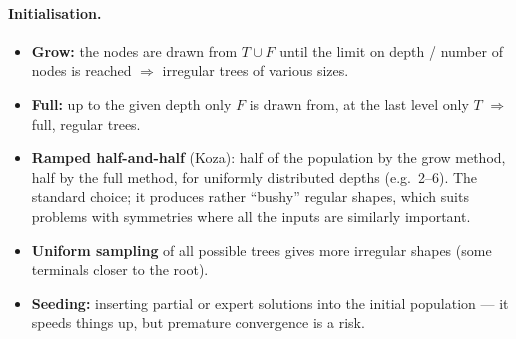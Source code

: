 \documentclass[11pt,a4paper]{article}
\theoremstyle{definition}
\providecommand{\uv}[1]{``#1''}
\begin{document}
\paragraph{Initialisation.}
\begin{itemize}
\item \textbf{Grow:} the nodes are drawn from $T \cup F$ until the limit on
  depth / number of nodes is reached $\Rightarrow$ irregular trees of various
  sizes.
\item \textbf{Full:} up to the given depth only $F$ is drawn from, at the last
  level only $T$ $\Rightarrow$ full, regular trees.
\item \textbf{Ramped half-and-half} (Koza): half of the population by the grow
  method, half by the full method, for uniformly distributed depths (e.g.\
  2--6). The standard choice; it produces rather \uv{bushy} regular shapes,
  which suits problems with symmetries where all the inputs are similarly
  important.
\item \textbf{Uniform sampling} of all possible trees gives more irregular
  shapes (some terminals closer to the root).
\item \textbf{Seeding:} inserting partial or expert solutions into the initial
  population --- it speeds things up, but premature convergence is a risk.
\end{itemize}
\end{document}
